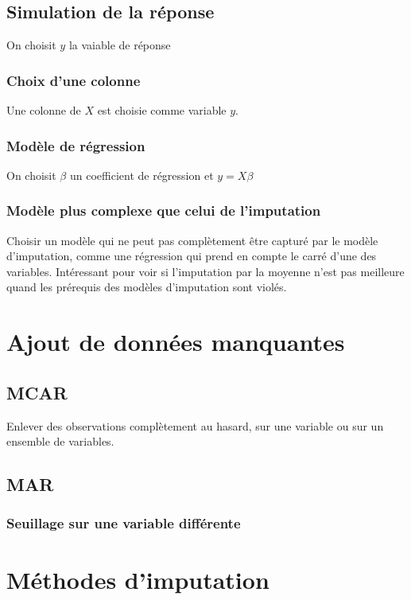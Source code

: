 \documentclass[12pt, a4paper]{article}
\begin{document}
\subsection{Simulation de la réponse}
On choisit $y$ la vaiable de réponse

\subsubsection{Choix d'une colonne}
Une colonne de $X$ est choisie comme variable $y$.

\subsubsection{Modèle de régression}
On choisit $\beta$ un coefficient de régression et $y = X\beta$

\subsubsection{Modèle plus complexe que celui de l'imputation}
Choisir un modèle qui ne peut pas complètement être capturé par le modèle d'imputation, comme une régression qui prend en compte le carré d'une des variables. Intéressant pour voir si l'imputation par la moyenne n'est pas meilleure quand les prérequis des modèles d'imputation sont violés.

\section{Ajout de données manquantes}
\label{missdata}
\subsection{MCAR}
Enlever des observations complètement au hasard, sur une variable ou sur un ensemble de variables.

\subsection{MAR}
\subsubsection{Seuillage sur une variable différente}

\section{Méthodes d'imputation}
\label{imputation}
\end{document}
